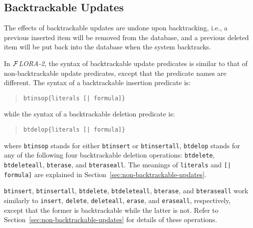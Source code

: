\documentclass[11pt]{article}
\newcommand{\FLORA}{{\mbox{${\cal F}${\small\it LORA}\rm\emph{-2}}}\xspace}
\begin{document}
\subsection{Backtrackable Updates}


%
The effects of backtrackable updates are undone upon backtracking,
i.e., a previous inserted item will be removed from the database, and
a previous deleted item will be put back into the database when the
system backtracks.

%
In \FLORA, the syntax of backtrackable update predicates is similar
to that of non-backtrackable update predicates, except that the
predicate names are different. The syntax of a backtrackable insertion
predicate is:
\begin{quote}
\begin{verbatim}
btinsop{literals [| formula]}
\end{verbatim}
\end{quote}
while the syntax of a backtrackable deletion predicate is:
\begin{quote}
\begin{verbatim}
btdelop{literals [| formula]}
\end{verbatim}
\end{quote}
where {\tt btinsop} stands for either {\tt btinsert} or {\tt btinsertall},
{\tt btdelop} stands for any of the following four backtrackable
deletion operations: {\tt btdelete}, {\tt btdeleteall}, {\tt bterase}, and
{\tt bteraseall}. The meanings of {\tt literals} and {\tt [| formula]} are
explained in Section~\ref{sec:non-backtrackable-updates}.

{\tt btinsert}, {\tt btinsertall}, {\tt btdelete}, {\tt btdeleteall},
{\tt bterase}, and {\tt bteraseall} work similarly to {\tt insert},
{\tt delete}, {\tt deleteall}, {\tt erase}, and {\tt eraseall},
respectively, except that the former is backtrackable while the latter
is not. Refer to Section~\ref{sec:non-backtrackable-updates} for
details of these operations.
\end{document}
